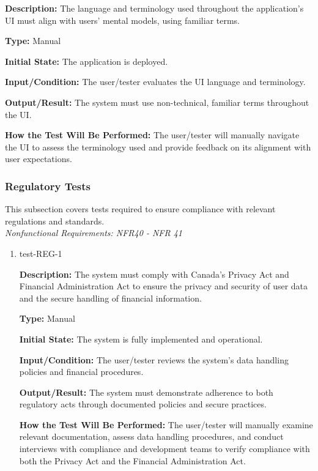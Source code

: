 \documentclass[12pt, titlepage]{article}
\begin{document}
\begin{enumerate}
\textbf{Description:} The language and terminology used throughout the application's UI must align with users' mental models, using familiar terms.

\textbf{Type:} Manual
					
\textbf{Initial State:} The application is deployed.
					
\textbf{Input/Condition:} The user/tester evaluates the UI language and terminology.
					
\textbf{Output/Result:} The system must use non-technical, familiar terms throughout the UI.
					
\textbf{How the Test Will Be Performed:} The user/tester will manually navigate the UI to assess the terminology used and provide feedback on its alignment with user expectations.

\end{enumerate}

\subsubsection{Regulatory Tests}

This subsection covers tests required to ensure compliance with relevant regulations and standards. \\
\textit{Nonfunctional Requirements: NFR40 - NFR 41}

\begin{enumerate}

\item{test-REG-1\\}

\textbf{Description:} The system must comply with Canada's Privacy Act and Financial Administration Act to ensure the privacy and security of user data and the secure handling of financial information.

\textbf{Type:} Manual
					
\textbf{Initial State:} The system is fully implemented and operational.
					
\textbf{Input/Condition:} The user/tester reviews the system's data handling policies and financial procedures.
					
\textbf{Output/Result:} The system must demonstrate adherence to both regulatory acts through documented policies and secure practices.
					
\textbf{How the Test Will Be Performed:} The user/tester will manually examine relevant documentation, assess data handling procedures, and conduct interviews with compliance and development teams to verify compliance with both the Privacy Act and the Financial Administration Act.

\end{enumerate}
\end{document}
